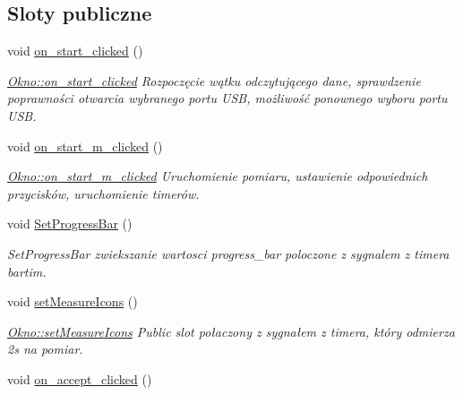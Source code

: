 \subsection*{Sloty publiczne}
\begin{DoxyCompactItemize}
\item 
\hypertarget{class_okno_ad6a171a82ec052ba0e8c721ffac0e870}{void \hyperlink{class_okno_ad6a171a82ec052ba0e8c721ffac0e870}{on\-\_\-start\-\_\-clicked} ()}\label{class_okno_ad6a171a82ec052ba0e8c721ffac0e870}

\begin{DoxyCompactList}\small\item\em \hyperlink{class_okno_ad6a171a82ec052ba0e8c721ffac0e870}{Okno\-::on\-\_\-start\-\_\-clicked} Rozpoczęcie wątku odczytującego dane, sprawdzenie poprawności otwarcia wybranego portu U\-S\-B, możliwość ponownego wyboru portu U\-S\-B. \end{DoxyCompactList}\item 
\hypertarget{class_okno_ad3e545f9470f154d09ab9cf91bee0b2a}{void \hyperlink{class_okno_ad3e545f9470f154d09ab9cf91bee0b2a}{on\-\_\-start\-\_\-m\-\_\-clicked} ()}\label{class_okno_ad3e545f9470f154d09ab9cf91bee0b2a}

\begin{DoxyCompactList}\small\item\em \hyperlink{class_okno_ad3e545f9470f154d09ab9cf91bee0b2a}{Okno\-::on\-\_\-start\-\_\-m\-\_\-clicked} Uruchomienie pomiaru, ustawienie odpowiednich przycisków, uruchomienie timerów. \end{DoxyCompactList}\item 
\hypertarget{class_okno_ae30bfa2ba063af6dac4680291bccb6cd}{void \hyperlink{class_okno_ae30bfa2ba063af6dac4680291bccb6cd}{Set\-Progress\-Bar} ()}\label{class_okno_ae30bfa2ba063af6dac4680291bccb6cd}

\begin{DoxyCompactList}\small\item\em Set\-Progress\-Bar zwiekszanie wartosci progress\-\_\-bar poloczone z sygnalem z timera bartim. \end{DoxyCompactList}\item 
\hypertarget{class_okno_aaf9c12bca53a881c5492cd7779cdecad}{void \hyperlink{class_okno_aaf9c12bca53a881c5492cd7779cdecad}{set\-Measure\-Icons} ()}\label{class_okno_aaf9c12bca53a881c5492cd7779cdecad}

\begin{DoxyCompactList}\small\item\em \hyperlink{class_okno_aaf9c12bca53a881c5492cd7779cdecad}{Okno\-::set\-Measure\-Icons} Public slot połaczony z sygnałem z timera, który odmierza 2s na pomiar. \end{DoxyCompactList}\item 
\hypertarget{class_okno_a6fea95038d5967dd336b87935b97170c}{void \hyperlink{class_okno_a6fea95038d5967dd336b87935b97170c}{on\-\_\-accept\-\_\-clicked} ()}\label{class_okno_a6fea95038d5967dd336b87935b97170c}


\end{DoxyCompactItemize}
